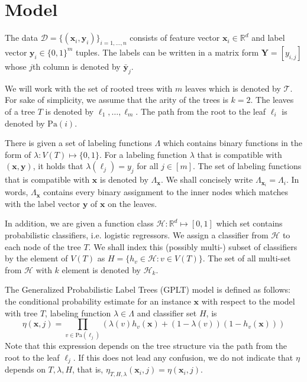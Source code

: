 \documentclass{article}
\newcommand{\R}{\mathbb{R}}
\newcommand{\cD}{\mathcal{D}}
\newcommand{\cH}{\mathcal{H}}
\newcommand{\cT}{\mathcal{T}}
\newcommand{\path}{\text{Pa}}
\renewcommand{\vec}[1]{\mathbf{#1}}
\newcommand{\bx}{\mathbf{x}}
\newcommand{\by}{\vec{y}}
\newcommand{\bY}{\vec{Y}}
\begin{document}
\section{Model}

The data $\cD = \{ (\bx_{i},\by_{i})\}_{i=1,\dots,n}$ consists of feature vector $\bx_i \in \R^d$ and label vector $\by_i\in \{ 0,1\}^m$ tuples. The labels can be written in a matrix form $\bY = [y_{i,j}]$ whose $j$\/th column is denoted by $\bar{\by}_{j}$.

We will work with the set of rooted trees with $m$ leaves which is denoted by $\cT$. For sake of simplicity, we assume that the arity of the trees is $k=2$. The leaves of a tree $T$ is denoted by $\ell_1, \dots , \ell_m$. The path from the root to the leaf $\ell_i$ is denoted by $\path (i )$. 

There is given a set of labeling functions $\Lambda$ which contains binary functions in the form of $\lambda: V(T) \mapsto \{0,1\}$. For a labeling function $\lambda$ that is compatible with $(\bx,\by)$, it holds that $\lambda(\ell_j) = y_{j}$ for all $j\in [m]$. The set of labeling functions that is compatible with $\bx$ is denoted by $\Lambda_{\bx}$. We shall concisely write 
$\Lambda_{\bx_i} = \Lambda_{i}$. In words, $\Lambda_{\bx}$ contains every binary assignment to the inner nodes which matches with the label vector $\by$ of $\bx$ on the leaves.

In addition, we are given a function class $\cH : \R^d \mapsto [0,1]$ which set contains probabilistic classifiers, i.e. logistic regressors. We assign a classifier from $\cH$ to each node of the tree $T$. We shall index this (possibly multi-) subset of classifiers by the element of $V(T)$ as $H = \{ h_{v} \in \cH : v\in V(T) \}$. The set of all multi-set from $\cH$ with $k$ element is denoted by  $\cH_k$.

The Generalized Probabilistic Label Trees (GPLT) model is defined as follows: the conditional probability estimate for an instance $\bx$ with respect to the model with tree $T$, labeling function $\lambda \in \Lambda$ and classifier set $H$,  is
\[
\eta( \bx, j ) = \prod_{v \in \path(\ell_j)} \left( \lambda(v) h_v (\bx) + (1-\lambda(v) ) (1-h_v (\bx)) \right)
\]
Note that this expression depends on the tree structure via the path from the root to the leaf $\ell_j$. If this does not lead any confusion, we do not indicate that $\eta$ depends on $T,\lambda,H$, that is, $\eta_{T,H,\lambda}( \bx_i, j ) = \eta( \bx_i, j ) $.
\end{document}
